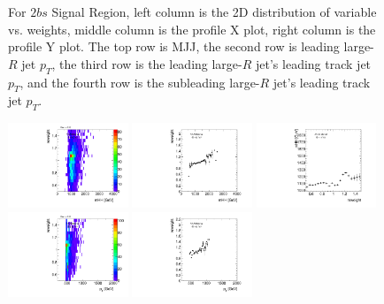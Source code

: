 \begin{figure}[htbp!]
\begin{center}
\caption{For $2bs$ Signal Region, left column is the 2D distribution of variable vs. weights, middle column is the profile X plot, right column is the profile Y plot. The top row is MJJ, the second row is leading large-$R$ jet $p_{T}$, the third row is the leading large-$R$ jet's leading track jet $p_{T}$, and the fourth row is the subleading large-$R$ jet's leading track jet $p_{T}$.}
\label{fig:app-reweight-dist-2b-SR}
\end{center}
\end{figure}


\begin{figure}[htbp!]
\begin{center}
\includegraphics[width=0.32\textwidth,angle=-90]{figures/boosted/AppendixReweight/Weights/3Trk_Signal_mHH_l_weight.pdf}
\includegraphics[width=0.32\textwidth,angle=-90]{figures/boosted/AppendixReweight/Weights/3Trk_Signal_mHH_l_weight_profx.pdf}
\includegraphics[width=0.32\textwidth,angle=-90]{figures/boosted/AppendixReweight/Weights/3Trk_Signal_mHH_l_weight_profy.pdf}\\
\includegraphics[width=0.32\textwidth,angle=-90]{figures/boosted/AppendixReweight/Weights/3Trk_Signal_leadHCand_Pt_m_weight.pdf}
\includegraphics[width=0.32\textwidth,angle=-90]{figures/boosted/AppendixReweight/Weights/3Trk_Signal_leadHCand_Pt_m_weight_profx.pdf}

\end{center}
\end{figure}
